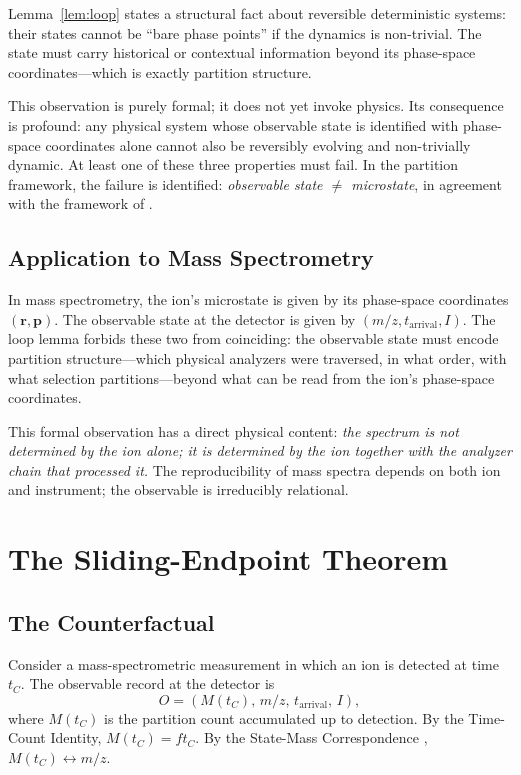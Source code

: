 \documentclass[twocolumn,10pt,a4paper]{article}
\theoremstyle{definition}
\theoremstyle{remark}
\newcommand{\Mcount}{M}
\begin{document}
Lemma~\ref{lem:loop} states a structural fact about reversible deterministic systems: their states cannot be ``bare phase points'' if the dynamics is non-trivial. The state must carry historical or contextual information beyond its phase-space coordinates---which is exactly partition structure.

This observation is purely formal; it does not yet invoke physics. Its consequence is profound: any physical system whose observable state is identified with phase-space coordinates alone cannot also be reversibly evolving and non-trivially dynamic. At least one of these three properties must fail. In the partition framework, the failure is identified: \emph{observable state $\neq$ microstate}, in agreement with the framework of \citep{sachikonye2025loschmidt}.

\subsection{Application to Mass Spectrometry}

In mass spectrometry, the ion's microstate is given by its phase-space coordinates $(\mathbf{r}, \mathbf{p})$. The observable state at the detector is given by $(m/z, t_{\mathrm{arrival}}, I)$. The loop lemma forbids these two from coinciding: the observable state must encode partition structure---which physical analyzers were traversed, in what order, with what selection partitions---beyond what can be read from the ion's phase-space coordinates.

This formal observation has a direct physical content: \emph{the spectrum is not determined by the ion alone; it is determined by the ion together with the analyzer chain that processed it.} The reproducibility of mass spectra depends on both ion and instrument; the observable is irreducibly relational.

\section{The Sliding-Endpoint Theorem}
\label{sec:sliding}

\subsection{The Counterfactual}

Consider a mass-spectrometric measurement in which an ion is detected at time $t_C$. The observable record at the detector is
\begin{equation}
    O = \left(\Mcount(t_C), \, m/z, \, t_{\mathrm{arrival}}, \, I\right),
\end{equation}
where $\Mcount(t_C)$ is the partition count accumulated up to detection. By the Time-Count Identity, $\Mcount(t_C) = f t_C$. By the State-Mass Correspondence \citep{sachikonye2025counting}, $\Mcount(t_C) \leftrightarrow m/z$.
\end{document}
